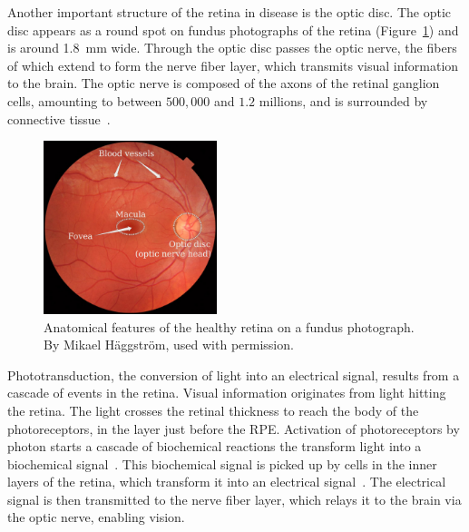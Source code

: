 \documentclass[12pt,a4paper]{journal}
\begin{document}
Another important structure of the retina in disease is the optic disc.
The optic disc appears as a round spot on fundus photographs of the retina (Figure~\ref{fig:Scans}) and is around \SI{1.8}{\mm} wide.
Through the optic disc passes the optic nerve, the fibers of which extend to form the nerve fiber layer, which transmits visual information to the brain.
The optic nerve is composed of the axons of the retinal ganglion cells, amounting to between $500,000$ and $1.2$ millions, and is surrounded by connective tissue~\cite{Salazar_2019}.

\begin{figure}[ht]
  \centering
  \includegraphics[width=0.45\textwidth]{FA}
  \caption{Anatomical features of the healthy retina on a fundus photograph. By Mikael H\"aggstr\"om, used with permission.}
  \label{fig:Scans}
\end{figure}


Phototransduction, the conversion of light into an electrical signal, results from a cascade of events in the retina. 
Visual information originates from light hitting the retina.
The light crosses the retinal thickness to reach the body of the photoreceptors, in the layer just before the RPE.
Activation of photoreceptors by photon starts a cascade of biochemical reactions the transform light into a biochemical signal~\cite{Hurley_2009}.
This biochemical signal is picked up by cells in the inner layers of the retina, which transform it into an electrical signal~\cite{Arslan_2018}.
The electrical signal is then transmitted to the nerve fiber layer, which relays it to the brain via the optic nerve, enabling vision.
\end{document}
